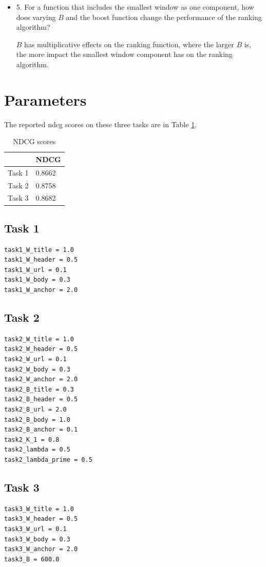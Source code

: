 \begin{itemize}
  
  \item[] 5. For a function that includes the smallest window as one component, how does varying $B$ and the boost function change the performance of the ranking algorithm?
      
      $B$ has multiplicative effects on the ranking function, where the larger $B$ is, the more impact the smallest window component has on the ranking algorithm.
\end{itemize}

\section{Parameters}
The reported ndcg scores on these three tasks are in Table \ref{tab:ndcg}.
\begin{table}[h!]
\begin{center}
\begin{tabular}{|l|l|}
  \hline
   & NDCG \\
  \hline
  Task 1 & 0.8662 \\
  Task 2 & 0.8758 \\
  Task 3 & 0.8682 \\
  \hline
\end{tabular}
  \caption{NDCG scores}\label{tab:ndcg}
\end{center}
\end{table}

\subsection{Task 1}
\begin{verbatim}
task1_W_title = 1.0
task1_W_header = 0.5
task1_W_url = 0.1
task1_W_body = 0.3
task1_W_anchor = 2.0
\end{verbatim}

\subsection{Task 2}
\begin{verbatim}
task2_W_title = 1.0
task2_W_header = 0.5
task2_W_url = 0.1
task2_W_body = 0.3
task2_W_anchor = 2.0
task2_B_title = 0.3
task2_B_header = 0.5
task2_B_url = 2.0
task2_B_body = 1.0
task2_B_anchor = 0.1
task2_K_1 = 0.8
task2_lambda = 0.5
task2_lambda_prime = 0.5 
\end{verbatim}


\subsection{Task 3}
\begin{verbatim}
task3_W_title = 1.0
task3_W_header = 0.5
task3_W_url = 0.1
task3_W_body = 0.3
task3_W_anchor = 2.0
task3_B = 600.0
\end{verbatim}




